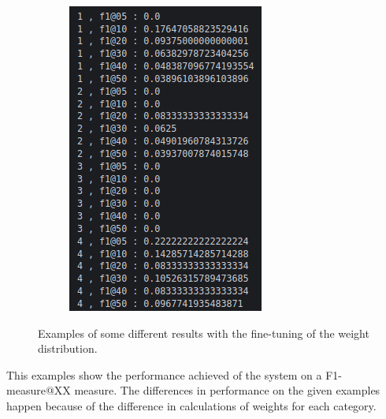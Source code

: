 \begin{figure}[H]
\begin{subfigure}{0.22\textwidth}
  \end{subfigure}
  \begin{subfigure}{0.22\textwidth}
  \includegraphics[width=\textwidth]{Sections/7Results/images/runexample4.png}\hfill
  \end{subfigure}
  \caption{Examples of some different results with the fine-tuning of the weight distribution.}
\end{figure}
\newpage

This examples show the performance achieved of the system on a F1-measure@XX measure. The differences in performance on the given examples happen because of the difference in calculations of weights for each category. 


